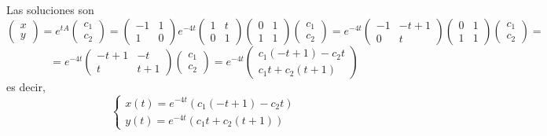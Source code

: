 \begin{sol}
    Las soluciones son 
    $$\begin{pmatrix}
        x \\
        y
    \end{pmatrix}=e^{tA}\begin{pmatrix}
        c_1 \\
        c_2
    \end{pmatrix}=\begin{pmatrix}
        -1 & 1 \\
        1 & 0
    \end{pmatrix}e^{-4t}\begin{pmatrix}
        1 & t \\
        0 & 1
    \end{pmatrix}\begin{pmatrix}
        0 & 1 \\
        1 & 1
    \end{pmatrix}\begin{pmatrix}
        c_1 \\
        c_2
    \end{pmatrix}=e^{-4t}\begin{pmatrix}
        -1 & -t+1 \\
        0 & t
    \end{pmatrix}\begin{pmatrix}
        0 & 1 \\
        1 & 1
    \end{pmatrix}\begin{pmatrix}
        c_1 \\
        c_2
    \end{pmatrix}=$$
    $$=e^{-4t}\begin{pmatrix}
        -t+1 & -t \\
        t & t+1
    \end{pmatrix}\begin{pmatrix}
        c_1 \\
        c_2
    \end{pmatrix}=e^{-4t}\begin{pmatrix}
        c_1(-t+1)-c_2t \\
        c_1t+c_2(t+1)
    \end{pmatrix}$$
    es decir, 
    $$\left\{\begin{array}{l}
         x(t)= e^{-4t}(c_1(-t+1)-c_2t)  \\
         y(t) =e^{-4t}( c_1t+c_2(t+1))
    \end{array} \right.$$
\end{sol}
